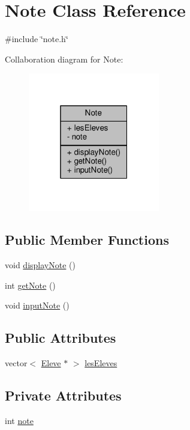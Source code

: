 \hypertarget{classNote}{\section{Note Class Reference}
\label{classNote}
}


{\ttfamily \#include \char`\"{}note.\+h\char`\"{}}



Collaboration diagram for Note\+:
\nopagebreak
\begin{figure}[H]
\begin{center}
\leavevmode
\includegraphics[width=163pt]{classNote__coll__graph}
\end{center}
\end{figure}
\subsection*{Public Member Functions}
\begin{DoxyCompactItemize}
\item 
void \hyperlink{classNote_acf7e21c45279867fd2bfd0381d335d3b}{display\+Note} ()
\item 
int \hyperlink{classNote_ac5bba8f7cab8e04533a53a335e231089}{get\+Note} ()
\item 
void \hyperlink{classNote_ad2635ced834ce1f504d1ee3861449f5c}{input\+Note} ()
\end{DoxyCompactItemize}
\subsection*{Public Attributes}
\begin{DoxyCompactItemize}
\item 
vector$<$ \hyperlink{classEleve}{Eleve} $\ast$ $>$ \hyperlink{classNote_a0db5f863b36a28546a5b22196f72e513}{les\+Eleves}
\end{DoxyCompactItemize}
\subsection*{Private Attributes}
\begin{DoxyCompactItemize}
\item 
int \hyperlink{classNote_aa8ae664544f95736c91379135c85874e}{note}
\end{DoxyCompactItemize}


